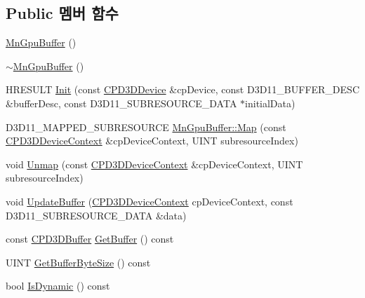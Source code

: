 \subsection*{Public 멤버 함수}
\begin{DoxyCompactItemize}
\item 
\hyperlink{class_m_n_l_1_1_mn_gpu_buffer_a7384edf2315dcacd76e090bd80cf3c72}{Mn\+Gpu\+Buffer} ()
\item 
\hyperlink{class_m_n_l_1_1_mn_gpu_buffer_a6628bd8e65df697f2fd95cdb6e841a04}{$\sim$\+Mn\+Gpu\+Buffer} ()
\item 
H\+R\+E\+S\+U\+LT \hyperlink{class_m_n_l_1_1_mn_gpu_buffer_a00bd28801336391d28e6d91e99a8bef3}{Init} (const \hyperlink{namespace_m_n_l_a1eec210db8f309a4a9ac0d9658784c31}{C\+P\+D3\+D\+Device} \&cp\+Device, const D3\+D11\+\_\+\+B\+U\+F\+F\+E\+R\+\_\+\+D\+E\+SC \&buffer\+Desc, const D3\+D11\+\_\+\+S\+U\+B\+R\+E\+S\+O\+U\+R\+C\+E\+\_\+\+D\+A\+TA $\ast$initial\+Data)
\item 
D3\+D11\+\_\+\+M\+A\+P\+P\+E\+D\+\_\+\+S\+U\+B\+R\+E\+S\+O\+U\+R\+CE \hyperlink{class_m_n_l_1_1_mn_gpu_buffer_aa28d7626be0829bb89db594cf253c62d}{Mn\+Gpu\+Buffer\+::\+Map} (const \hyperlink{namespace_m_n_l_aab3aabb6c9360e44ddc8b0bb563c2107}{C\+P\+D3\+D\+Device\+Context} \&cp\+Device\+Context, U\+I\+NT subresource\+Index)
\item 
void \hyperlink{class_m_n_l_1_1_mn_gpu_buffer_a152eb5876d380e888a065328da057330}{Unmap} (const \hyperlink{namespace_m_n_l_aab3aabb6c9360e44ddc8b0bb563c2107}{C\+P\+D3\+D\+Device\+Context} \&cp\+Device\+Context, U\+I\+NT subresource\+Index)
\item 
void \hyperlink{class_m_n_l_1_1_mn_gpu_buffer_a77c025ff683cce5025b58e87d28d7549}{Update\+Buffer} (\hyperlink{namespace_m_n_l_aab3aabb6c9360e44ddc8b0bb563c2107}{C\+P\+D3\+D\+Device\+Context} cp\+Device\+Context, const D3\+D11\+\_\+\+S\+U\+B\+R\+E\+S\+O\+U\+R\+C\+E\+\_\+\+D\+A\+TA \&data)
\item 
const \hyperlink{namespace_m_n_l_aab9c90a8c27ac6410a9cc7cd89efeef1}{C\+P\+D3\+D\+Buffer} \hyperlink{class_m_n_l_1_1_mn_gpu_buffer_ae929d387721832436c24e3faf6cd375d}{Get\+Buffer} () const
\item 
U\+I\+NT \hyperlink{class_m_n_l_1_1_mn_gpu_buffer_aa6a6a785b1df73b80d33b8f3d828c618}{Get\+Buffer\+Byte\+Size} () const
\item 
bool \hyperlink{class_m_n_l_1_1_mn_gpu_buffer_a617ce607255f345962df39eec00e9593}{Is\+Dynamic} () const
\end{DoxyCompactItemize}
